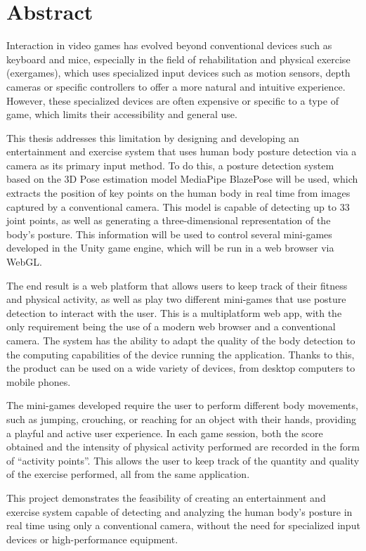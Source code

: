 \newpage
\section{Abstract}
\label{sec:abstract}
Interaction in video games has evolved beyond conventional devices such as keyboard and mice,
especially in the field of rehabilitation and physical exercise (exergames), which uses specialized
input devices such as motion sensors, depth cameras or specific controllers to offer a more natural
and intuitive experience. However, these specialized devices are often expensive or specific to a
type of game, which limits their accessibility and general use.

This thesis addresses this limitation by designing and developing an entertainment and exercise
system that uses human body posture detection via a camera as its primary input method. To do this,
a posture detection system based on the 3D Pose estimation model MediaPipe BlazePose will be used,
which extracts the position of key points on the human body in real time from images captured by a
conventional camera. This model is capable of detecting up to 33 joint points, as well as generating
a three-dimensional representation of the body's posture. This information will be used to control
several mini-games developed in the Unity game engine, which will be run in a web browser via WebGL.

The end result is a web platform that allows users to keep track of their fitness and physical activity,
as well as play two different mini-games that use posture detection to interact with the user. This is a
multiplatform web app, with the only requirement being the use of a modern web browser and a conventional
camera. The system has the ability to adapt the quality of the body detection to the computing capabilities
of the device running the application. Thanks to this, the product can be used on a wide variety of devices,
from desktop computers to mobile phones.

The mini-games developed require the user to perform different body movements, such as jumping, crouching,
or reaching for an object with their hands, providing a playful and active user experience. In each game
session, both the score obtained and the intensity of physical activity performed are recorded in the form
of \enquote{activity points}. This allows the user to keep track of the quantity and quality of the exercise
performed, all from the same application.

This project demonstrates the feasibility of creating an entertainment and exercise system capable of
detecting and analyzing the human body's posture in real time using only a conventional camera,
without the need for specialized input devices or high-performance equipment.

